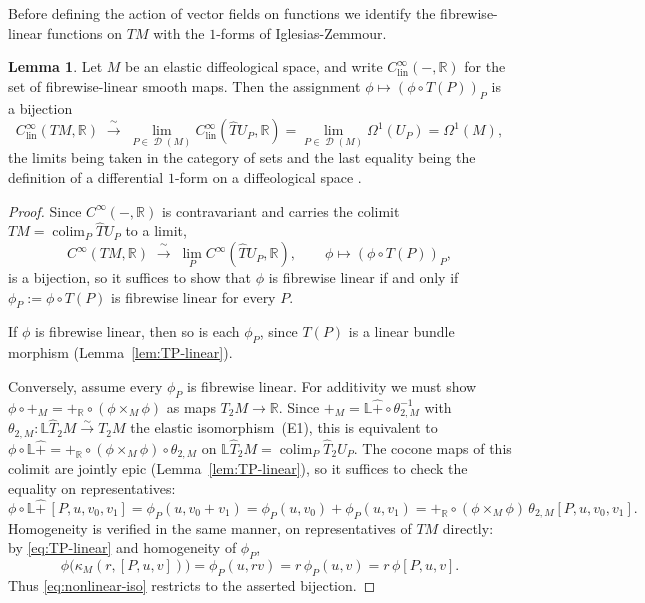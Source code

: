 \documentclass{amsart}
\newcommand{\R}{\mathbb{R}}
\newcommand{\Clin}{C^{\infty}_{\mathrm{lin}}}
\DeclareMathOperator{\D}{\mathcal{D}}
\DeclareMathOperator{\colim}{colim}
\theoremstyle{definition}
\newtheorem{lem}[thm]{Lemma}
\begin{document}
Before defining the action of vector fields on functions we identify the
fibrewise-linear functions on $TM$ with the $1$-forms of Iglesias-Zemmour.

\begin{lem}\label{lem:cotangent-omega}
Let $M$ be an elastic diffeological space, and write $\Clin(-,\R)$ for the set
of fibrewise-linear smooth maps. Then the assignment
$\phi\mapsto(\phi\circ T(P))_P$ is a bijection
\[
  \Clin(TM,\R)
  \;\xrightarrow{\ \sim\ }\;
  \lim_{P\in\D(M)}\Clin(\hat{T}U_P,\R)
  =\lim_{P\in\D(M)}\Omega^{1}(U_P)
  =\Omega^{1}(M),
\]
the limits being taken in the category of sets and the last equality being the
definition of a differential $1$-form on a diffeological space \cite[Section~1.1]{B23}.
\end{lem}

\begin{proof}
Since $C^{\infty}(-,\R)$ is contravariant and carries the colimit
$TM=\colim_P\hat{T}U_P$ to a limit,
\begin{equation}\label{eq:nonlinear-iso}
  C^{\infty}(TM,\R)\;\xrightarrow{\ \sim\ }\;
  \lim_{P}C^{\infty}(\hat{T}U_P,\R),
  \qquad
  \phi\longmapsto(\phi\circ T(P))_{P},
\end{equation}
is a bijection, so it suffices to show that $\phi$ is fibrewise linear if and
only if $\phi_P:=\phi\circ T(P)$ is fibrewise linear for every $P$.

If $\phi$ is fibrewise linear, then so is each $\phi_P$, since $T(P)$ is a
linear bundle morphism (Lemma~\ref{lem:TP-linear}).

Conversely, assume every $\phi_P$ is fibrewise linear. For additivity we must
show $\phi\circ+_M=+_{\R}\circ(\phi\times_M\phi)$ as maps $T_2M\to\R$. Since
$+_M=\mathbb{L}\hat{+}\circ\theta_{2,M}^{-1}$ with
$\theta_{2,M}\colon\mathbb{L}\hat{T}_2M\xrightarrow{\sim}T_2M$ the elastic
isomorphism~(E1), this is equivalent to
$\phi\circ\mathbb{L}\hat{+}=+_{\R}\circ(\phi\times_M\phi)\circ\theta_{2,M}$
on $\mathbb{L}\hat{T}_2M=\colim_P\hat{T}_2U_P$. The cocone maps of this colimit
are jointly epic (Lemma~\ref{lem:TP-linear}), so it suffices to check the
equality on representatives:
\[
  \phi\circ\mathbb{L}\hat{+}\,[P,u,v_0,v_1]
  =\phi_P(u,v_0+v_1)
  =\phi_P(u,v_0)+\phi_P(u,v_1)
  =+_{\R}\circ(\phi\times_M\phi)\,\theta_{2,M}[P,u,v_0,v_1].
\]
Homogeneity is verified in the same manner, on representatives of $TM$
directly: by \eqref{eq:TP-linear} and homogeneity of $\phi_P$,
\[
  \phi\bigl(\kappa_M(r,[P,u,v])\bigr)
  =\phi_P(u,rv)
  =r\,\phi_P(u,v)
  =r\,\phi[P,u,v].
\]
Thus \eqref{eq:nonlinear-iso} restricts to the asserted bijection.
\end{proof}
\end{document}
